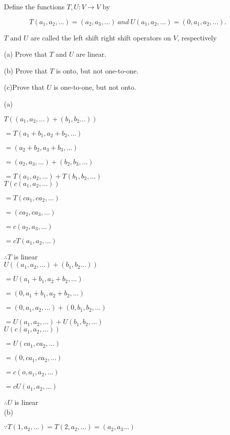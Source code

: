 \documentclass
[answers]
{exam}
\begin{document}
\begin{questions}
Define the functions $T,U:V \rightarrow V$ by

\[T(a_1,a_2,\ldots)=(a_2,a_3,\ldots)\ and\ U(a_1,a_2, \ldots)=(0,a_1,a_2, \ldots).\]

$T$ and $U$ are called the left shift right shift operators on $V$, respectively

(a) Prove that $T$ and $U$ are linear.

(b) Prove that $T$ is onto, but not one-to-one.

(c)Prove that $U$ is one-to-one, but not onto.

\begin{solution}


(a)

$T((a_1,a_2,\ldots)+(b_1,b_2\ldots))$

$=T(a_1+b_1,a_2+b_2,\ldots)$

$=(a_2+b_2,a_3+b_3,\ldots)$

$=(a_2,a_3,\ldots)+(b_2,b_3,\ldots)$

$=T(a_1,a_2,\ldots)+T(b_1,b_2,\ldots)$
\\

$T(c(a_1,a_2,\ldots))$

$=T(ca_1,ca_2,\ldots)$

$=(ca_2,ca_3,\ldots)$

$=c(a_2,a_3,\ldots)$

$=cT(a_1,a_2,\ldots)$

$\therefore T$ is linear
\\

$U((a_1,a_2,\ldots)+(b_1,b_2\ldots))$

$=U(a_1+b_1,a_2+b_2,\ldots)$

$=(0,a_1+b_1,a_2+b_2,\ldots)$

$=(0,a_1,a_2,\ldots)+(0,b_1,b_2,\ldots)$

$=U(a_1,a_2,\ldots)+U(b_1,b_2,\ldots)$
\\

$U(c(a_1,a_2,\ldots))$

$=U(ca_1,ca_2,\ldots)$

$=(0,ca_1,ca_2,\ldots)$

$=c(o,a_1,a_2,\ldots)$

$=cU(a_1,a_2,\ldots)$

$\therefore U$ is linear
\\

(b)

$\because T(1,a_2,\ldots)=T(2,a_2,\ldots)=(a_2,a_3\ldots)$


\end{solution}
\end{questions}
\end{document}
